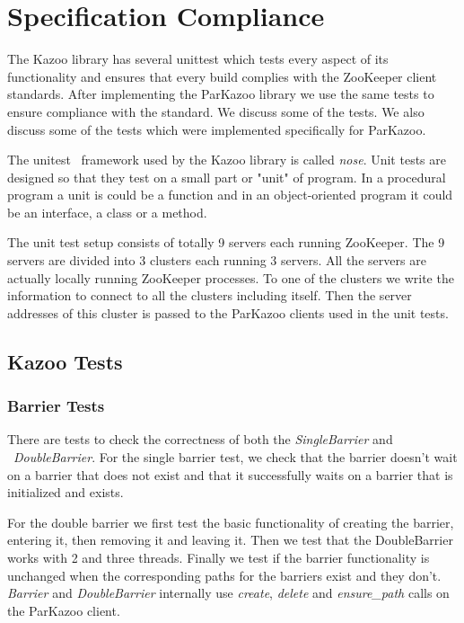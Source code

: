 \chapter{Specification Compliance}

The Kazoo library has several unittest which tests every aspect of its functionality and ensures that every build complies with the ZooKeeper client standards. After implementing the ParKazoo library we use the same tests to ensure compliance with the standard. We discuss some of the tests. We also discuss some of the tests which were implemented specifically for ParKazoo.

The unitest~\cite{hamill2004unit} framework used by the Kazoo library is called \textit{nose}. Unit tests are designed so that they test on a small part or "unit" of program. In a procedural program a unit is could be a function and in an object-oriented program it could be an interface, a class or a method.

The unit test setup consists of totally 9 servers each running ZooKeeper. The 9 servers are divided into 3 clusters each running 3 servers. All the servers are actually locally running ZooKeeper processes. To one of the clusters we write the information to connect to all the clusters including itself. Then the server addresses of this cluster is passed to the ParKazoo clients used in the unit tests. 

\section{Kazoo Tests}

\subsection{Barrier Tests}
There are tests to check the correctness of both the \textit{SingleBarrier} and ~\textit{DoubleBarrier}. For the single barrier test, we check that the barrier doesn't wait on a barrier that does not exist and that it successfully waits on a barrier that is initialized and exists.

For the double barrier we first test the basic functionality of creating the barrier, entering it, then removing it and leaving it. Then we test that the DoubleBarrier works with 2 and three threads. Finally we test if the barrier functionality is unchanged when the corresponding paths for the barriers exist and they don't. \textit{Barrier} and \textit{DoubleBarrier} internally use \textit{create}, \textit{delete} and \textit{ensure\_path} calls on the ParKazoo client.

